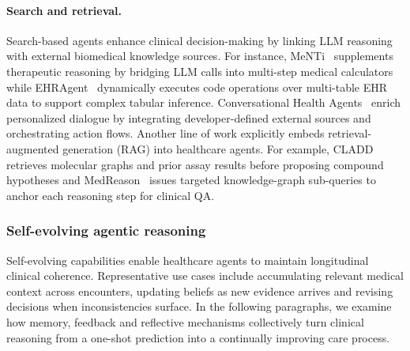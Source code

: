\paragraph{Search and retrieval.}
Search-based agents enhance clinical decision-making by linking LLM reasoning with external biomedical knowledge sources. For instance, MeNTi~\cite{zhu2025mentibridgingmedicalcalculator} supplements therapeutic reasoning by bridging LLM calls into multi-step medical calculators while EHRAgent~\cite{wenqi2024ehragent} dynamically executes code operations over multi-table EHR data to support complex tabular inference. Conversational Health Agents~\cite{abbasian2024conversationalhealthagentspersonalized} enrich personalized dialogue by integrating developer-defined external sources and orchestrating action flows. Another line of work explicitly embeds retrieval-augmented generation (RAG) into healthcare agents. For example, CLADD~\cite{lee2025ragenhancedcollaborativellmagents} retrieves molecular graphs and prior assay results before proposing compound hypotheses and MedReason~\cite{wu2025medreasonelicitingfactualmedical} issues targeted knowledge-graph sub-queries to anchor each reasoning step for clinical QA.




\subsubsection{Self-evolving agentic reasoning}
\label{sec:app-healthcare-evolve}



Self-evolving capabilities enable healthcare agents to maintain longitudinal clinical coherence. Representative use cases include accumulating relevant medical context across encounters, updating beliefs as new evidence arrives and revising decisions when inconsistencies surface. In the following paragraphs, we examine how memory, feedback and reflective mechanisms collectively turn clinical reasoning from a one-shot prediction into a continually improving care process.


